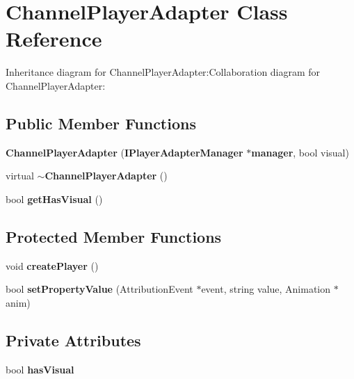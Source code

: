 \section{ChannelPlayerAdapter Class Reference}
\label{classbr_1_1pucrio_1_1telemidia_1_1ginga_1_1ncl_1_1adapters_1_1av_1_1ChannelPlayerAdapter}
Inheritance diagram for ChannelPlayerAdapter:Collaboration diagram for ChannelPlayerAdapter:\subsection*{Public Member Functions}
\begin{CompactItemize}
\item 
\textbf{ChannelPlayerAdapter} ({\bf IPlayerAdapterManager} $\ast${\bf manager}, bool visual)\label{classbr_1_1pucrio_1_1telemidia_1_1ginga_1_1ncl_1_1adapters_1_1av_1_1ChannelPlayerAdapter_283f3e4624a3135b83dbd68d7b53e344}

\item 
virtual {\bf $\sim$ChannelPlayerAdapter} ()\label{classbr_1_1pucrio_1_1telemidia_1_1ginga_1_1ncl_1_1adapters_1_1av_1_1ChannelPlayerAdapter_bfa34d2a0e264d2a1ee99e52eae70c6a}

\item 
bool \textbf{getHasVisual} ()\label{classbr_1_1pucrio_1_1telemidia_1_1ginga_1_1ncl_1_1adapters_1_1av_1_1ChannelPlayerAdapter_b2b4a0ff7827181527c3636619c2b55e}

\end{CompactItemize}
\subsection*{Protected Member Functions}
\begin{CompactItemize}
\item 
void \textbf{createPlayer} ()\label{classbr_1_1pucrio_1_1telemidia_1_1ginga_1_1ncl_1_1adapters_1_1av_1_1ChannelPlayerAdapter_2fbb9533e3d66799b0a433c9298ea70f}

\item 
bool \textbf{setPropertyValue} (AttributionEvent $\ast$event, string value, Animation $\ast$anim)\label{classbr_1_1pucrio_1_1telemidia_1_1ginga_1_1ncl_1_1adapters_1_1av_1_1ChannelPlayerAdapter_3e4b84e57de627326fc7bf7c4e129ba5}

\end{CompactItemize}
\subsection*{Private Attributes}
\begin{CompactItemize}
\item 
bool {\bf hasVisual}\label{classbr_1_1pucrio_1_1telemidia_1_1ginga_1_1ncl_1_1adapters_1_1av_1_1ChannelPlayerAdapter_0a54acb712166416fc704e7fedf96d1e}

\end{CompactItemize}


